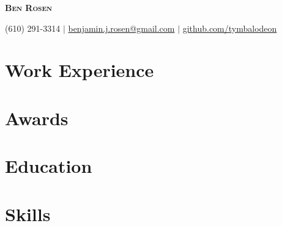 \documentclass{article}
\begin{document}
\Huge{
  \textbf{
    \scshape{Ben Rosen}
  }
}

\small{(610) 291-3314}
$|$
\underline{benjamin.j.rosen@gmail.com}
$|$
\underline{github.com/tymbalodeon}

\section{Work Experience}

\section{Awards}

\section{Education}

\section{Skills}
\end{document}
